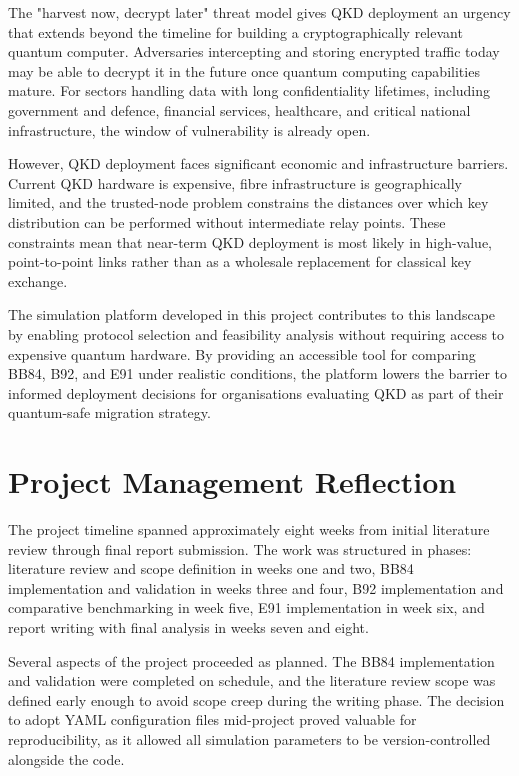 \documentclass[10pt, a4paper]{report}
\begin{document}
The "harvest now, decrypt later" threat model gives QKD deployment an urgency that extends beyond the timeline for building a cryptographically relevant quantum computer. Adversaries intercepting and storing encrypted traffic today may be able to decrypt it in the future once quantum computing capabilities mature. For sectors handling data with long confidentiality lifetimes, including government and defence, financial services, healthcare, and critical national infrastructure, the window of vulnerability is already open.

However, QKD deployment faces significant economic and infrastructure barriers. Current QKD hardware is expensive, fibre infrastructure is geographically limited, and the trusted-node problem constrains the distances over which key distribution can be performed without intermediate relay points. These constraints mean that near-term QKD deployment is most likely in high-value, point-to-point links rather than as a wholesale replacement for classical key exchange.

The simulation platform developed in this project contributes to this landscape by enabling protocol selection and feasibility analysis without requiring access to expensive quantum hardware. By providing an accessible tool for comparing BB84, B92, and E91 under realistic conditions, the platform lowers the barrier to informed deployment decisions for organisations evaluating QKD as part of their quantum-safe migration strategy.



\section{Project Management Reflection}

The project timeline spanned approximately eight weeks from initial literature review through final report submission. The work was structured in phases: literature review and scope definition in weeks one and two, BB84 implementation and validation in weeks three and four, B92 implementation and comparative benchmarking in week five, E91 implementation in week six, and report writing with final analysis in weeks seven and eight.

Several aspects of the project proceeded as planned. The BB84 implementation and validation were completed on schedule, and the literature review scope was defined early enough to avoid scope creep during the writing phase. The decision to adopt YAML configuration files mid-project proved valuable for reproducibility, as it allowed all simulation parameters to be version-controlled alongside the code.
\end{document}

